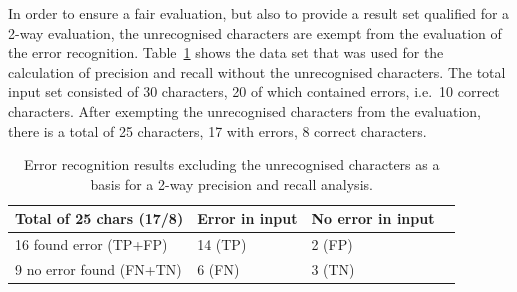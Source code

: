 In order to ensure a fair evaluation, but also to provide 
a result set qualified for a 2-way evaluation, the unrecognised characters are 
exempt from the evaluation of the error recognition.
Table~\ref{table:eval:resultsprecisionandrecallnumbersunrecognisedexempt}
shows the data set that was used for the calculation of precision and recall
without the unrecognised characters. The total input set consisted of 30 characters, 20 of which contained errors, i.e.\ 10 correct characters.
After exempting the unrecognised characters from the evaluation, 
there is a total of 25 characters, 17 with errors, 8 correct characters.
\begin{table}[htbp]
\begin{center}
  \begin{tabular}{|l|l|l|p{200pt}|}
    \hline
    Total of 25 chars (17/8)  & Error in input      & No error in input \\
    \hline
    16 found error (TP+FP)    & 14 (TP)             & 2 (FP) \\
    \hline
    9 no error found (FN+TN)  & 6 (FN)              & 3 (TN) \\
    \hline
  \end{tabular}
\end{center}
\caption{Error recognition results excluding the unrecognised characters as a
basis for a 2-way precision and recall analysis.}
\label{table:eval:resultsprecisionandrecallnumbersunrecognisedexempt}
\end{table}

